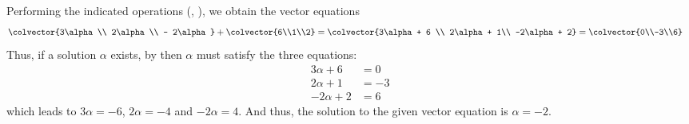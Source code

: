 %
Performing the indicated operations (, ), we obtain the vector equations
\begin{align*}
\colvector{3\alpha \\ 2\alpha\\ - 2\alpha} + \colvector{6\\1\\2} 
&= \colvector{3\alpha + 6 \\ 2\alpha + 1\\ -2\alpha + 2}
 = \colvector{0\\-3\\6}
\end{align*}
Thus, if a solution $\alpha$ exists, by  then $\alpha$ must satisfy the three equations:
\begin{align*}
3\alpha + 6 &= 0\\
2\alpha + 1 &= -3\\
-2 \alpha + 2 &= 6
\end{align*}
which leads to $3\alpha = -6$, $2\alpha = -4$ and $-2\alpha = 4$.  
And thus, the solution to the given vector equation is $\alpha = -2$.